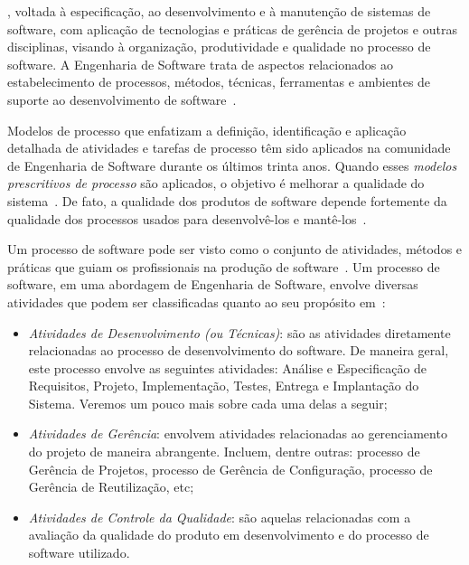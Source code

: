 , voltada à especificação, ao desenvolvimento e à manutenção de sistemas de software, com aplicação de tecnologias e práticas de gerência de projetos e outras disciplinas, visando à organização, produtividade e qualidade no processo de software. A Engenharia de Software trata de aspectos relacionados ao estabelecimento de processos, métodos, técnicas, ferramentas e ambientes de suporte ao desenvolvimento de software~\cite{falboEngSoft}.

Modelos de processo que enfatizam a definição, identificação e aplicação detalhada de atividades e tarefas de processo têm sido aplicados na comunidade de Engenharia de Software durante os últimos trinta anos. Quando esses \textit{modelos prescritivos de processo} são aplicados, o objetivo é melhorar a qualidade do sistema~\cite{presmannSoft}. 
De fato, a qualidade dos produtos de software depende fortemente da qualidade dos processos usados para desenvolvê-los e mantê-los~\cite{falboEngSoft}.

Um processo de software pode ser visto como o conjunto de atividades, métodos e práticas que guiam os profissionais na produção de software~\cite{falboEngSoft}. Um processo de software, em uma abordagem de Engenharia de Software, envolve diversas atividades que podem ser classificadas quanto ao seu propósito em~\cite{falboEngReq}:

\begin{itemize}
	\item \textit{Atividades de Desenvolvimento (ou Técnicas)}: são as atividades diretamente relacionadas ao processo de desenvolvimento do software. De maneira geral, este processo envolve as seguintes atividades: Análise e Especificação de Requisitos, Projeto, Implementação, Testes, Entrega e Implantação do Sistema. Veremos um pouco mais sobre cada uma delas a seguir;
	\item \textit{Atividades de Gerência}: envolvem atividades relacionadas ao gerenciamento do projeto de maneira abrangente. Incluem, dentre outras: processo de Gerência de Projetos, processo de Gerência de Configuração, processo de Gerência de Reutilização, etc;
	\item \textit{Atividades de Controle da Qualidade}: são aquelas relacionadas com a avaliação da qualidade do produto em desenvolvimento e do processo de software utilizado. 
\end{itemize}




